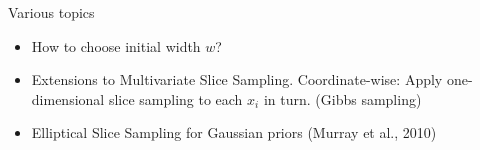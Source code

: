 \documentclass[aspectratio=169]{beamer}
\begin{document}








\begin{frame}{Various topics}
	\begin{itemize}
		\item How to choose initial width $w$?
		\item Extensions to Multivariate Slice Sampling. Coordinate-wise: Apply one-dimensional slice sampling to
each $x_i$ in turn. (Gibbs sampling)
		\item Elliptical Slice Sampling for Gaussian priors (Murray et al., 2010)
	\end{itemize}
\end{frame}
\end{document}
